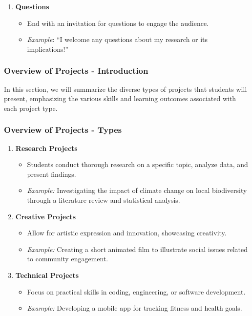 \documentclass[aspectratio=169]{beamer}
\begin{document}
\begin{frame}[fragile]
\begin{enumerate}
        \item \textbf{Questions}
            \begin{itemize}
                \item End with an invitation for questions to engage the audience.
                \item \textit{Example}: “I welcome any questions about my research or its implications!”
            \end{itemize}
    \end{enumerate}
\end{frame}

\begin{frame}[fragile]
    \frametitle{Overview of Projects - Introduction}
    In this section, we will summarize the diverse types of projects that students will present, emphasizing the various skills and learning outcomes associated with each project type. 
\end{frame}

\begin{frame}[fragile]
    \frametitle{Overview of Projects - Types}
    \begin{enumerate}
        \item \textbf{Research Projects}
            \begin{itemize}
                \item Students conduct thorough research on a specific topic, analyze data, and present findings.
                \item \textit{Example:} Investigating the impact of climate change on local biodiversity through a literature review and statistical analysis.
            \end{itemize}
        
        \item \textbf{Creative Projects}
            \begin{itemize}
                \item Allow for artistic expression and innovation, showcasing creativity.
                \item \textit{Example:} Creating a short animated film to illustrate social issues related to community engagement.
            \end{itemize}
        
        \item \textbf{Technical Projects}
            \begin{itemize}
                \item Focus on practical skills in coding, engineering, or software development.
                \item \textit{Example:} Developing a mobile app for tracking fitness and health goals.
            \end{itemize}
    \end{enumerate}
\end{frame}
\end{document}
